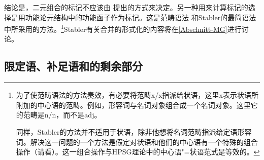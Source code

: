 结论是，二元组合的标记不应该由 \citet{Chomsky2008a,Chomsky2013a}提出的方式来决定。另一种用来计算标记的选择是用功能论元结构中的功能函子作为标记\citep[]{BE95a}。这是范畴语法\citep{Ajdukiewicz35a-u,Steedman2000a-u} 和Stabler的最简语法\citeyearpar{Stabler2010b}中所采用的方法。\footnote{%
为了使范畴语法的方法奏效，有必要将范畴x/x指派给状语，这里x表示状语所附加的中心语的范畴。例如，形容词与名词对象组合成一个名词对象。这里它的范畴是n/n，而不是adj。

同样，Stabler的方法并不适用于状语，除非他想将名词范畴指派给定语形容词。解决这一问题的一个方法是假定对状语和他们的中心语有一个特殊的组合操作（请看\citealp[\S~3.2]{FG2002a}）。这一组合操作与HPSG理论中的中心语"=状语范式是等效的。
}Stabler有关合并的形式化的内容将在\ref{Abschnitt-MG}进行讨论。


\subsection{限定语、补足语和\xbartc 的剩余部分}
\label{Abschnitt-Spezfikatoren-MP}

